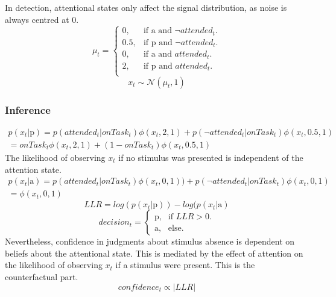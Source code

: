 \documentclass[12pt,twoside]{reedthesis}
\begin{document}
In detection, attentional states only affect the signal distribution, as noise is always centred at 0.
\begin{equation}
  \mu_t=\begin{cases}
    0, & \text{if a and $\neg attended_t$}.\\
    0.5, & \text{if p and $\neg attended_t$}.\\
    0, & \text{if a and $attended_t$}.\\
    2, & \text{if p and $attended_t$}.\\
  \end{cases}
\end{equation}
\begin{equation}
   x_t \sim \mathcal{N}(\mu_t,1)    
\end{equation}
\hypertarget{inference-7}{%
\subsubsection*{Inference}\label{inference-7}}
\begin{equation}
\begin{aligned}
    p(x_t | \text{p}) = p(attended_t | onTask_t) \phi(x_t,2,1) + p(\neg attended_t|onTask_t) \phi(x_t,0.5,1)\\
    = onTask_t \phi(x_t,2,1) + (1-onTask_t) \phi(x_t,0.5,1)
    \end{aligned}
\end{equation}
The likelihood of observing \(x_t\) if no stimulus was presented is independent of the attention state.
\begin{equation}
\begin{aligned}
    p(x_t | \text{a}) = p(attended_t | onTask_t) \phi(x_t,0,1)) + p(\neg attended_t | onTask_t) \phi(x_t,0,1)\\
    = \phi(x_t,0,1)
    \end{aligned}
\end{equation}
\begin{equation}
LLR = log(p(x_t | \text{p}))-log(p(x_t | \text{a})
\end{equation}
\begin{equation}
  decision_t=\begin{cases}
    \text{p}, & \text{if } LLR>0.\\
   \text{a}, & \text{else}.
    
  \end{cases}
\end{equation}
Nevertheless, confidence in judgments about stimulus absence is dependent on beliefs about the attentional state. This is mediated by the effect of attention on the likelihood of observing \(x_t\) if a stimulus were present. This is the counterfactual part.
\begin{equation}
confidence_t \propto |LLR|
\end{equation}
\backmatter
\end{document}
